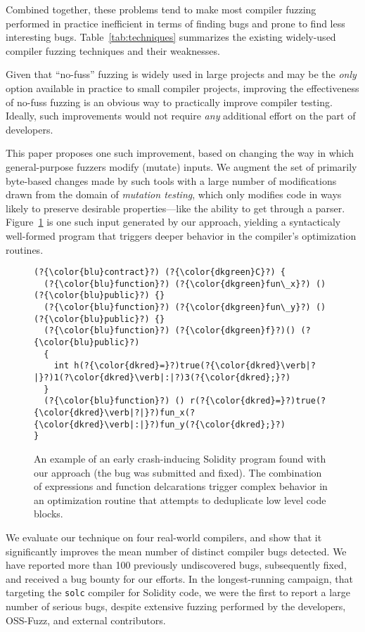   Combined together, these problems tend to make most compiler fuzzing
  performed in practice inefficient in
  terms of finding bugs and prone to find less interesting bugs.
  Table~\ref{tab:techniques} summarizes the existing widely-used
  compiler fuzzing techniques and their weaknesses.

  Given that ``no-fuss'' fuzzing is widely used in large projects and
  may be the \emph{only} option available in
  practice to small compiler projects, improving the effectiveness of no-fuss fuzzing is an obvious way to practically improve compiler
  testing.  Ideally, such improvements would not require \emph{any}
  additional effort on the part of developers.

  This paper proposes one such improvement, based on changing the way
  in which general-purpose fuzzers modify (mutate) inputs.  We augment
  the set of primarily byte-based changes made by such tools with a large number of
  modifications drawn from the domain of \emph{mutation testing},
  which only modifies code in ways likely to preserve desirable
  properties---like the ability to get through a parser. Figure~\ref{lst:sol-exemplar}
  is one such input generated by our approach, yielding a syntacticaly well-formed program that
  triggers deeper behavior in the compiler's optimization routines.

\begin{figure}[h!]
\begin{lstlisting}[basicstyle=\scriptsize\ttfamily,numbers=none,xleftmargin=0.7em,xrightmargin=.7em]
(?{\color{blu}contract}?) (?{\color{dkgreen}C}?) {
  (?{\color{blu}function}?) (?{\color{dkgreen}fun\_x}?) () (?{\color{blu}public}?) {}
  (?{\color{blu}function}?) (?{\color{dkgreen}fun\_y}?) () (?{\color{blu}public}?) {}
  (?{\color{blu}function}?) (?{\color{dkgreen}f}?)() (?{\color{blu}public}?)
  {
    int h(?{\color{dkred}=}?)true(?{\color{dkred}\verb|?|}?)1(?\color{dkred}\verb|:|?)3(?{\color{dkred};}?)
  }
  (?{\color{blu}function}?) () r(?{\color{dkred}=}?)true(?{\color{dkred}\verb|?|}?)fun_x(?{\color{dkred}\verb|:|}?)fun_y(?{\color{dkred};}?)
}
\end{lstlisting}
\caption{An example of an early crash-inducing Solidity program found
  with our approach (the bug was submitted and fixed). The combination of expressions and function delcarations trigger complex behavior in an optimization routine that attempts to deduplicate low level code blocks.}
\label{lst:sol-exemplar}
\end{figure}

  We evaluate
  our technique on four real-world compilers, and show that it
  significantly improves the mean number of distinct compiler bugs
  detected.  We have reported more than
  100 previously undiscovered 
  bugs, subsequently fixed, and received a bug bounty for
  our efforts.  In the longest-running campaign, that targeting the
  {\tt solc} compiler for Solidity code, we were the first to
  report a large number of serious bugs, despite extensive
  fuzzing  performed by the developers, OSS-Fuzz,
  and external contributors.
